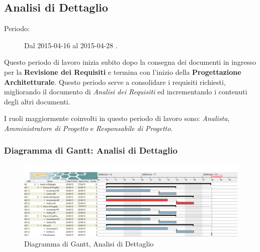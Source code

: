 \newpage
\subsection{Analisi di Dettaglio}
\begin{description}
	\item[Periodo:] Dal 2015-04-16 al 2015-04-28 .
\end{description}
Questo periodo di lavoro inizia subito dopo la consegna dei documenti in ingresso per la \textbf{Revisione dei Requisiti} e termina con l'inizio della \textbf{Progettazione Architetturale}. Questo periodo serve a consolidare i requisiti richiesti, migliorando il documento di \textit{Analisi dei Requisiti} ed incrementando i contenuti degli altri documenti. 

\noindent I ruoli maggiormente coinvolti in questo periodo di lavoro sono: \textit{Analista}, \textit{Amministratore di Progetto} e \textit{Responsabile di Progetto}.
\subsubsection{Diagramma di Gantt: Analisi di Dettaglio}
\begin{figure}[h]
\centering
\includegraphics[width=\textwidth]{./img/analisi_dettaglio.png}
\caption{Diagramma di Gantt, Analisi di Dettaglio}
\end{figure}

\newpage
